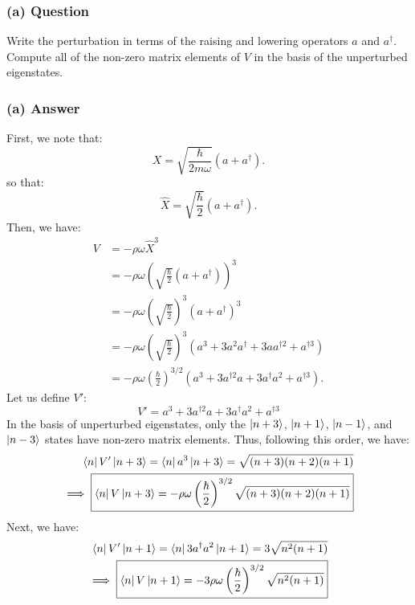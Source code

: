 \documentclass{article}
\begin{document}
\subsubsection*{(a) Question}
Write the perturbation in terms of the raising and lowering operators \( a \) and \( a^\dagger \). Compute all of the non-zero matrix elements of \( V \) in the basis of the unperturbed eigenstates.

\subsubsection*{(a) Answer}
First, we note that:
\begin{equation}
    X = \sqrt{\frac{\hbar}{2m\omega}}(a + a^\dagger).
\end{equation}
so that:
\begin{equation}
    \hat{X} = \sqrt{\frac{\hbar}{2}}(a + a^\dagger).
\end{equation}
Then, we have:
\begin{align}
    V &= -\rho \omega \hat{X}^3 \\
    &= -\rho \omega \left( \sqrt{\frac{\hbar}{2}}(a + a^\dagger) \right)^3 \\
    &= -\rho \omega \left( \sqrt{\frac{\hbar}{2}} \right)^3 (a + a^\dagger)^3 \\
    &= -\rho \omega \left( \sqrt{\frac{\hbar}{2}} \right)^3 (a^3 + 3a^2a^\dagger + 3aa^{\dagger 2} + a^{\dagger 3}) \\
    &= -\rho \omega \left(\frac{\hbar}{2}\right)^{3/2} (a^3 + 3a^{\dagger 2}a + 3a^{\dagger}a^2 + a^{\dagger 3}).
\end{align}
Let us define $V'$:
\begin{equation}
    V' = a^3 + 3a^{\dagger 2}a + 3a^{\dagger}a^2 + a^{\dagger 3}
\end{equation}
In the basis of unperturbed eigenstates, only the $\ket{n+3}$, $\ket{n+1}$, $\ket{n-1}$, and $\ket{n-3}$ states have non-zero matrix elements. Thus, following this order, we have:
\begin{align}
    \bra{n}V'\ket{n+3} = \bra{n}a^3\ket{n+3} = \sqrt{(n+3)(n+2)(n+1)} \\ \implies \boxed{\bra{n}V\ket{n+3} = -\rho \omega \left(\frac{\hbar}{2}\right)^{3/2} \sqrt{(n+3)(n+2)(n+1)}} \\
\end{align}
Next, we have:
\begin{align}
    \bra{n}V'\ket{n+1} = \bra{n}3a^{\dagger}a^2\ket{n+1} = 3\sqrt{n^2(n+1)} \\ \implies \boxed{\bra{n}V\ket{n+1} = -3\rho \omega \left(\frac{\hbar}{2}\right)^{3/2} \sqrt{n^2(n+1)}} \\
\end{align}
\end{document}
